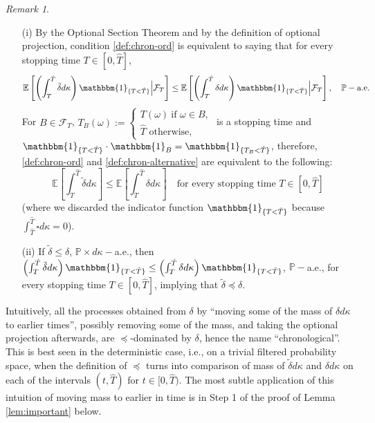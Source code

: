 \documentclass[11pt, oneside]{article}   	%
\theoremstyle{plain}
\theoremstyle{definition}
\theoremstyle{remark}
\newtheorem{rem}[thm]{Remark}
\begin{document}
\begin{rem}\label{rem:chron-ord-def}
\begin{enumerate}
\item[(i)] By the Optional Section Theorem and by the definition of optional projection, condition \eqref{def:chron-ord} is equivalent to saying that for every stopping time $T\in[0,\hat{T}]$,
\begin{equation}\label{def:chron-alternative}
\mathbb{E}\left[\left(\int_T^{\hat{T}}\tilde\delta d\kappa\right) \mathbbm{1}_{\{T<{\hat{T}}\}}\Big\vert\mathcal{F}_T\right]\leq \mathbb{E}\left[\left(\int_T^{\hat{T}}\delta d\kappa\right) \mathbbm{1}_{\{T<{\hat{T}}\}}\Big\vert\mathcal{F}_T\right],\quad \mathbb{P}-\text{a.e.}
\end{equation}
For $B\in\mathcal{F}_T$, $T_B(\omega):=\begin{cases}T(\omega)\ \text{if }\omega\in B,\\ {\hat{T}} \text{ otherwise},\end{cases}$ is a stopping time and $\mathbbm{1}_{\{T<{\hat{T}}\}}\cdot\mathbbm{1}_B=\mathbbm{1}_{\{T_B<{\hat{T}}\}}$, therefore, \eqref{def:chron-ord} and \eqref{def:chron-alternative} are equivalent to the following:
\begin{equation}\label{eq:chron-ord-characterization}
\mathbb{E}\left[\int_T^{\hat{T}}\tilde\delta d\kappa\right]\leq \mathbb{E}\left[\int_T^{\hat{T}}\delta d\kappa\right]\quad\text{for every stopping time } T\in[0,{\hat{T}}]
\end{equation}
(where we discarded the indicator function $\mathbbm{1}_{\{T<{\hat{T}}\}}$ because $\int_{\hat{T}}^{\hat{T}}\square d\kappa=0$).
\item[(ii)] If $\tilde{\delta}\leq\delta$, $\mathbb{P}\times d\kappa-$a.e., then $\left(\int_T^{\hat{T}}\tilde{\delta}d\kappa\right)\mathbbm{1}_{\{T<{\hat{T}}\}}\leq\left(\int_T^{\hat{T}}\delta d\kappa\right)\mathbbm{1}_{\{T<{\hat{T}}\}}$, $\mathbb{P}-$a.e., for every stopping time $T\in[0,{\hat{T}}]$, implying that $\tilde{\delta}\preceq\delta$.
\end{enumerate}
\end{rem}
Intuitively, all the processes obtained from $\delta$ by ``moving some of the mass of $\delta d\kappa$ to earlier times'', possibly removing some of the mass, and taking the optional projection afterwards, are $\preceq$-dominated by $\delta$, hence the name ``chronological''. This is best seen in the deterministic case, i.e., on a trivial filtered probability space, when the definition of $\preceq$ turns into comparison of mass of $\tilde\delta d\kappa$ and $\delta d\kappa$ on each of the intervals $(t,{\hat{T}})$ for $t\in[0,{\hat{T}})$. The most subtle application of this intuition of moving mass to earlier in time is in Step 1 of the proof of Lemma \ref{lem:important} below.
\end{document}
